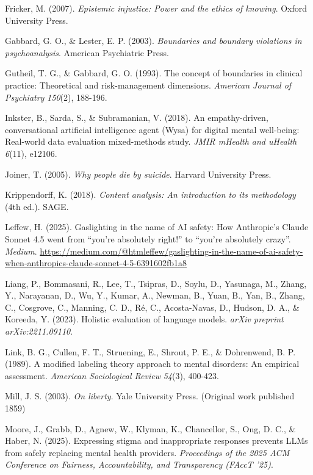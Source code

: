 \documentclass[11pt]{article}
\begin{document}
\hangindent=0.5in  Fricker, M. (2007). \emph{Epistemic injustice: Power and the ethics of knowing}. Oxford University Press.\par
\hangindent=0.5in  Gabbard, G. O., \& Lester, E. P. (2003). \emph{Boundaries and boundary violations in psychoanalysis}. American Psychiatric Press.\par
\hangindent=0.5in  Gutheil, T. G., \& Gabbard, G. O. (1993). The concept of boundaries in clinical practice: Theoretical and risk-management dimensions. \emph{American Journal of Psychiatry} \emph{150}(2), 188-196.\par
\hangindent=0.5in  Inkster, B., Sarda, S., \& Subramanian, V. (2018). An empathy-driven, conversational artificial intelligence agent (Wysa) for digital mental well-being: Real-world data evaluation mixed-methods study. \emph{JMIR mHealth and uHealth} \emph{6}(11), e12106.\par
\hangindent=0.5in  Joiner, T. (2005). \emph{Why people die by suicide}. Harvard University Press.\par
\hangindent=0.5in  Krippendorff, K. (2018). \emph{Content analysis: An introduction to its methodology} (4th ed.). SAGE.\par
\hangindent=0.5in  Leffew, H. (2025). Gaslighting in the name of AI safety: How Anthropic's Claude Sonnet 4.5 went from ``you're absolutely right!'' to ``you're absolutely crazy''. \emph{Medium}. \url{https://medium.com/@htmleffew/gaslighting-in-the-name-of-ai-safety-when-anthropics-claude-sonnet-4-5-6391602fb1a8}\par
\hangindent=0.5in  Liang, P., Bommasani, R., Lee, T., Tsipras, D., Soylu, D., Yasunaga, M., Zhang, Y., Narayanan, D., Wu, Y., Kumar, A., Newman, B., Yuan, B., Yan, B., Zhang, C., Cosgrove, C., Manning, C. D., R{\'e}, C., Acosta-Navas, D., Hudson, D. A., \& Koreeda, Y. (2023). Holistic evaluation of language models. \emph{arXiv preprint arXiv:2211.09110}.\par
\hangindent=0.5in  Link, B. G., Cullen, F. T., Struening, E., Shrout, P. E., \& Dohrenwend, B. P. (1989). A modified labeling theory approach to mental disorders: An empirical assessment. \emph{American Sociological Review} \emph{54}(3), 400-423.\par
\hangindent=0.5in  Mill, J. S. (2003). \emph{On liberty}. Yale University Press. (Original work published 1859)\par
\hangindent=0.5in  Moore, J., Grabb, D., Agnew, W., Klyman, K., Chancellor, S., Ong, D. C., \& Haber, N. (2025). Expressing stigma and inappropriate responses prevents LLMs from safely replacing mental health providers. \emph{Proceedings of the 2025 ACM Conference on Fairness, Accountability, and Transparency (FAccT '25)}.\par
\end{document}
